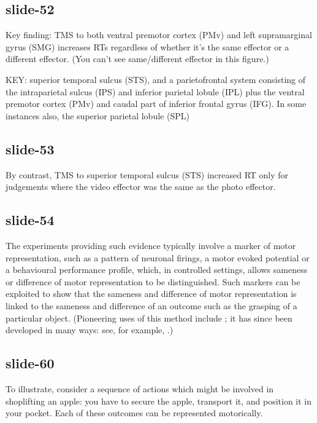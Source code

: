 \documentclass[12pt,\papersize]{extarticle}
\begin{document}
\subsection{slide-52}
Key finding: TMS to both ventral premotor cortex (PMv) and left supramarginal gyrus (SMG)
increases RTs regardless of whether it’s the same effector or a different effector.
(You can’t see same/different effector in this figure.)
 
KEY: superior temporal sulcus (STS), and a parietofrontal system consisting of the intraparietal
sulcus (IPS) and inferior parietal lobule (IPL) plus the ventral premotor cortex (PMv) and caudal
part of inferior frontal gyrus (IFG). In some instances also, the superior parietal lobule (SPL)
 
\subsection{slide-53}
By contrast, TMS to superior temporal sulcus (STS) increased RT only for judgements
where the video effector was the same as the photo effector.
 
\subsection{slide-54}
The experiments providing such evidence typically involve a marker of motor representation,
such as a pattern of neuronal firings, a motor evoked potential or a behavioural performance
profile, which, in controlled settings, allows sameness or difference of motor representation
to be distinguished. Such markers can be exploited to show that the sameness and difference
of motor representation is linked to the sameness and difference of an outcome such as the
grasping of a particular object.
(Pioneering uses of this method include \citealp{rizzolatti:1988_functional,Rizzolatti:2001ug};
it has since been developed in many ways: see, for example,
\citet{hamilton:2008_action, cattaneo:2009_representation, cattaneo:2010_state-dependent,
rochat:2010_responses, bonini:2010_ventral, koch:2010_resonance}.)
 
\subsection{slide-60}
To illustrate, consider a sequence of actions which might be involved in shoplifting an apple: you have to secure the apple, transport it, and position it in your pocket.
Each of these outcomes can be represented motorically.
 
\end{document}
